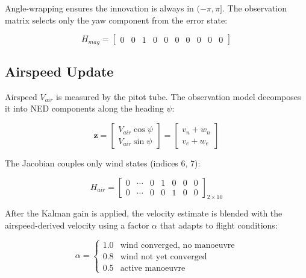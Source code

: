 \documentclass[12pt,a4paper]{article}
\newcommand{\bz}{\mathbf{z}}
\begin{document}
Angle-wrapping ensures the innovation is always in $(-\pi, \pi]$. The
observation matrix selects only the yaw component from the error state:

\begin{equation}
    H_{mag} = \begin{bmatrix} 0 & 0 & 1 & 0 & 0 & 0 & 0 & 0 & 0 & 0 \end{bmatrix}
    \label{eq:H_mag}
\end{equation}

\subsection{Airspeed Update}

Airspeed $V_{air}$ is measured by the pitot tube. The observation model
decomposes it into NED components along the heading $\psi$:

\begin{equation}
    \bz =
    \begin{bmatrix} V_{air}\cos\psi \\ V_{air}\sin\psi \end{bmatrix} =
    \begin{bmatrix} v_n + w_n \\ v_e + w_e \end{bmatrix}
    \label{eq:airspeed_model}
\end{equation}

The Jacobian couples only wind states (indices 6, 7):

\begin{equation}
    H_{air} = \begin{bmatrix}
        0 & \cdots & 0 & 1 & 0 & 0 & 0 \\
        0 & \cdots & 0 & 0 & 1 & 0 & 0
    \end{bmatrix}_{2 \times 10}
\end{equation}

After the Kalman gain is applied, the velocity estimate is blended with the
airspeed-derived velocity using a factor $\alpha$ that adapts to flight
conditions:

\begin{equation}
    \alpha =
    \begin{cases}
        1.0 & \text{wind converged, no manoeuvre} \\
        0.8 & \text{wind not yet converged} \\
        0.5 & \text{active manoeuvre}
    \end{cases}
\end{equation}
\end{document}

